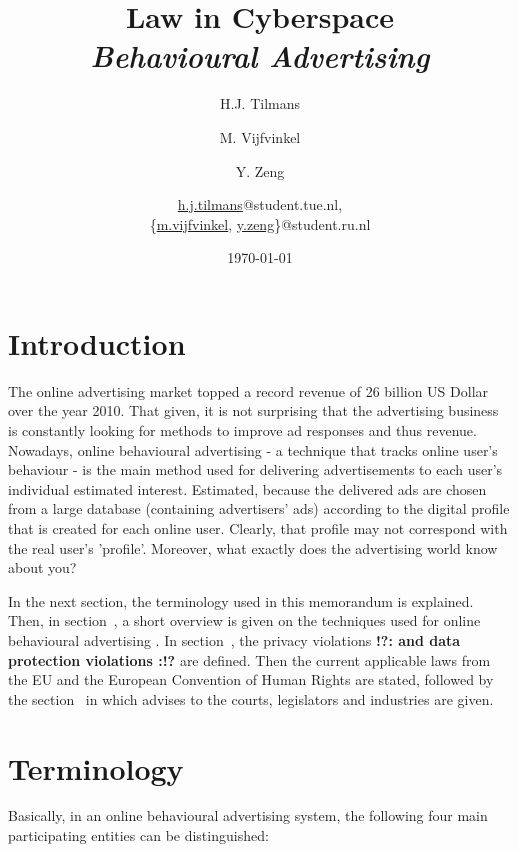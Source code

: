 \documentclass[11pt]{article}
\title{\textbf{Law in Cyberspace\\ \emph{Behavioural Advertising}}}
\author{
	H.J. Tilmans
	\and M. Vijfvinkel
	\and Y. Zeng
	\and
	\href{mailto:h.j.tilmans@student.tue.nl}{h.j.tilmans}@student.tue.nl,\\
	\{\href{mailto:m.vijfvinkel@student.ru.nl}{m.vijfvinkel},
	\href{mailto:y.zeg@student.ru.nl}{y.zeng}\}@student.ru.nl
}
\date{\today}
\newcommand{\tocheck}[1]{{\bf !?: #1 :!?}}
\newcommand{\oba}{online behavioural advertising }
\begin{document}
\maketitle
\section{Introduction}
The online advertising market topped a record revenue of 26 billion US Dollar over the year 2010. \cite{IAB2011}
That given, it is not surprising that the advertising business is constantly looking for methods to improve ad responses and thus revenue.
Nowadays, \oba - a technique that tracks online user's behaviour - is the main method used for delivering advertisements to each user's individual estimated interest. Estimated, because the delivered ads are chosen from a large database (containing advertisers' ads) according to the digital profile that is created for each online user. Clearly, that profile may not correspond with the real user's 'profile'.
Moreover, what exactly does the advertising world know about you?

In the next section, the terminology used in this memorandum is explained. Then, in section~, a short overview is given on the techniques used for \oba. In section~, the privacy violations \tocheck{and data protection violations} are defined. Then the current applicable laws from the EU and the European Convention of Human Rights are stated, followed by the section~ in which advises to the courts, legislators and industries are given.

\section{Terminology}
\label{terminology}
Basically, in an \oba system, the following four main participating entities can be distinguished:
\end{document}
